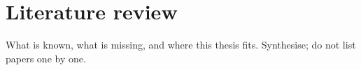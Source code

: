 \chapter{Literature review}

What is known, what is missing, and where this thesis fits. Synthesise; do not list papers one by one.
